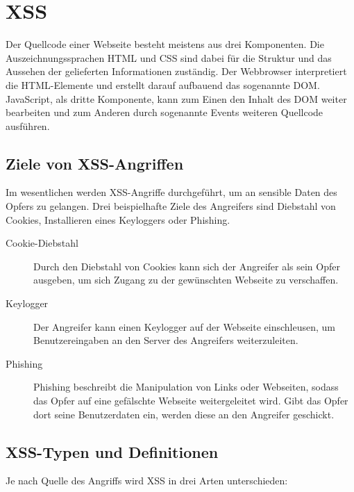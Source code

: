 \section{\acf{XSS}}\label{sssec:XSSDefinition}

Der Quellcode einer Webseite besteht meistens aus drei Komponenten. Die Auszeichnungssprachen HTML und CSS sind dabei für die Struktur und das Aussehen der gelieferten Informationen zuständig. Der Webbrowser interpretiert die HTML-Elemente und erstellt darauf aufbauend das sogenannte \ac{DOM}. JavaScript, als dritte Komponente, kann zum Einen den Inhalt des DOM weiter bearbeiten und zum Anderen durch sogenannte Events weiteren Quellcode ausführen.

\subsection{Ziele von \ac{XSS}-Angriffen}
		Im wesentlichen werden XSS-Angriffe durchgeführt, um an sensible Daten des Opfers zu gelangen. Drei beispielhafte Ziele des Angreifers sind Diebstahl von \gls{Cookies}, Installieren eines \gls{Keylogger}s oder \gls{Phishing}.

		\begin{description}
			\item[Cookie-Diebstahl]{Durch den Diebstahl von Cookies kann sich der Angreifer als sein Opfer ausgeben, um sich Zugang zu der gewünschten Webseite zu verschaffen.}
			\item[Keylogger]{Der Angreifer kann einen Keylogger auf der Webseite einschleusen, um Benutzereingaben an den Server des Angreifers weiterzuleiten.}
			\item[Phishing]{Phishing beschreibt die Manipulation von Links oder Webseiten, sodass das Opfer auf eine gefälschte Webseite weitergeleitet wird. Gibt das Opfer dort seine Benutzerdaten ein, werden diese an den Angreifer geschickt.}
		\end{description}


\subsection{\ac{XSS}-Typen und Definitionen}
		Je nach Quelle des Angriffs wird \acl{XSS} in drei Arten unterschieden: 

